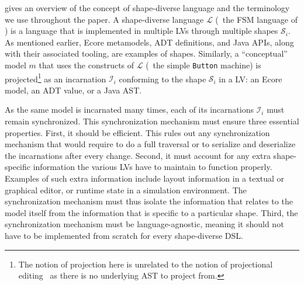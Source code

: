  gives an overview of the concept of shape-diverse language and the terminology we use throughout the paper.
A shape-diverse language $\mathcal{L}$ (\eg~the FSM language of ) is a language that is implemented in multiple LVs through multiple shapes $\mathcal{S}_i$.
As mentioned earlier, Ecore metamodels, ADT definitions, and Java APIs, along with their associated tooling, are examples of shapes.
Similarly, a ``conceptual'' model $m$ that uses the constructs of $\mathcal{L}$ (\eg~the simple {\footnotesize \texttt{Button}} machine) is projected\footnote{The notion of projection here is unrelated to the notion of projectional editing~\cite{voelter2015projecting} as there is no underlying AST to project from.} as an incarnation $\mathcal{I}_i$ conforming to the shape $\mathcal{S}_i$ in a LV: an Ecore model, an ADT value, or a Java AST.


As the same model is incarnated many times, each of its incarnations $\mathcal{I}_i$ must remain synchronized.
This synchronization mechanism must ensure three essential properties.
First, it should be efficient.
This rules out any synchronization mechanism that would require to do a full traversal or to serialize and deserialize the incarnations after every change.
Second, it must account for any extra shape-specific information the various LVs have to maintain to function properly.
Examples of such extra information include layout information in a textual or graphical editor, or runtime state in a simulation environment.
The synchronization mechanism must thus isolate the information that relates to the model itself from the information that is specific to a particular shape.
Third, the synchronization mechanism must be language-agnostic, meaning it should not have to be implemented from scratch for every shape-diverse DSL.
